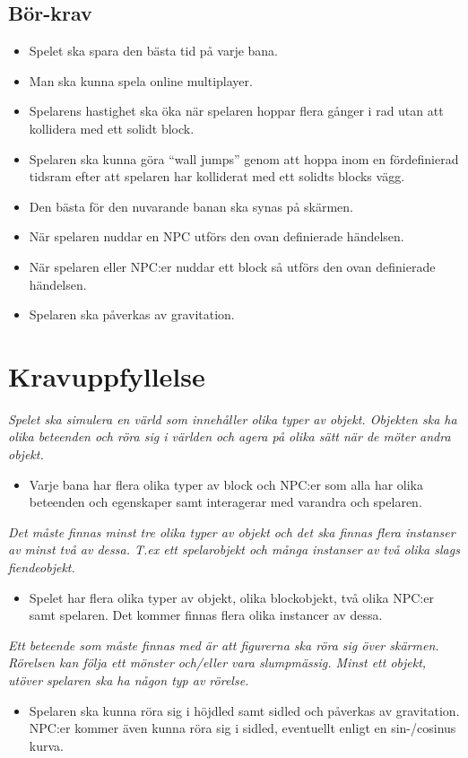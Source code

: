 \documentclass{TDP003mall}
\begin{document}
\subsection{Bör-krav}
\begin{itemize}
\item Spelet ska spara den bästa tid på varje bana.
\item Man ska kunna spela online multiplayer.
\item Spelarens hastighet ska öka när spelaren hoppar flera gånger i rad utan att kollidera med ett solidt block.
\item Spelaren ska kunna göra ``wall jumps'' genom att hoppa inom en fördefinierad tidsram efter att spelaren har kolliderat med ett solidts blocks vägg.
\item Den bästa för den nuvarande banan ska synas på skärmen.
\item När spelaren nuddar en NPC utförs den ovan definierade händelsen.
\item När spelaren eller NPC:er nuddar ett block så utförs den ovan definierade händelsen.
\item Spelaren ska påverkas av gravitation.
\end{itemize}

\section{Kravuppfyllelse}
\textit{Spelet ska simulera en värld som innehåller olika typer av objekt. Objekten ska ha olika beteenden och röra
sig i världen och agera på olika sätt när de möter andra objekt.}
\begin{itemize}
\item Varje bana har flera olika typer av block och NPC:er som alla har olika beteenden och egenskaper samt interagerar med varandra och spelaren.
\end{itemize}


\noindent\textit{Det måste finnas minst tre olika typer av objekt och det ska finnas flera instanser av minst två av dessa.
T.ex ett spelarobjekt och många instanser av två olika slags fiendeobjekt.}
\begin{itemize}
\item Spelet har flera olika typer av objekt, olika blockobjekt, två olika NPC:er samt spelaren. Det kommer finnas flera olika instancer av dessa.
\end{itemize}

\noindent\textit{Ett beteende som måste finnas med är att figurerna ska röra sig över skärmen. Rörelsen kan följa ett
mönster och/eller vara slumpmässig. Minst ett objekt, utöver spelaren ska ha någon typ av rörelse.}
\begin{itemize}
\item Spelaren ska kunna röra sig i höjdled samt sidled och påverkas av gravitation. NPC:er kommer även kunna röra sig i sidled, eventuellt enligt en sin-/cosinus kurva.
\end{itemize}
\end{document}

